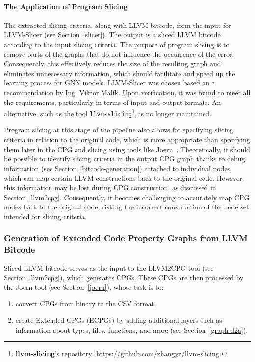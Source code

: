 \paragraph{The Application of Program Slicing}
The extracted slicing criteria, along with LLVM bitcode, form the input for LLVM-Slicer (see Section~\ref{slicer}). The output is a sliced LLVM bitcode according to the input slicing criteria. The purpose of program slicing is to remove parts of the graphs that do not influence the occurrence of the error. Consequently, this effectively reduces the size of the resulting graph and eliminates unnecessary information, which should facilitate and speed up the learning process for GNN models. LLVM-Slicer was chosen based on a recommendation by Ing. Viktor Malík. Upon verification, it was found to meet all the requirements, particularly in terms of input and output formats. An alternative, such as the tool \texttt{llvm-slicing}\footnote{\textbf{llvm-slicing}'s repository: \url{https://github.com/zhangyz/llvm-slicing}.}, is no longer maintained.

Program slicing at this stage of the pipeline also allows for specifying slicing criteria in relation to the original code, which is more appropriate than specifying them later in the CPG and slicing using tools like Joern~\cite{joern-doc}. Theoretically, it should be possible to identify slicing criteria in the output CPG graph thanks to debug information (see Section~\ref{bitcode-generation}) attached to individual nodes, which can map certain LLVM constructions back to the original code. However, this information may be lost during CPG construction, as discussed in Section~\ref{llvm2cpg}. Consequently, it becomes challenging to accurately map CPG nodes back to the original code, risking the incorrect construction of the node set intended for slicing criteria.

\subsubsection{Generation of Extended Code Property Graphs from LLVM Bitcode}
Sliced LLVM bitcode serves as the input to the LLVM2CPG tool (see Section~\ref{llvm2cpg}), which generates CPGs. These CPGs are then processed by the Joern tool (see Section~\ref{joern}), whose task is to:

\begin{enumerate}
    \item convert CPGs from binary to the CSV format,
    \item create Extended CPGs (ECPGs) by adding additional layers such as information about types, files, functions, and more (see Section~\ref{graph-d2a}).
\end{enumerate}

